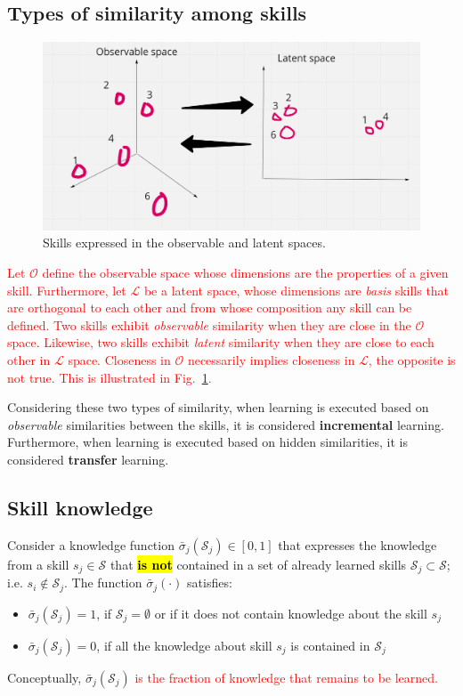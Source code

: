 \subsection{Types of similarity among skills}
\begin{figure}[!ht]
	\centering
	\includegraphics[width=0.95\columnwidth]{fig/observable_to_latent.png}
	\caption{Skills expressed in the observable and latent spaces.}
	\label{fig:types_of_similarity}
\end{figure}
\textcolor{red}{Let $\mathcal{O}$ define the observable space whose dimensions are the properties of a given skill. Furthermore, let $\mathcal{L}$ be a latent space, whose dimensions are \emph{basis} skills that are orthogonal to each other and from whose composition any skill can be defined. Two skills exhibit \emph{observable} similarity when they are close in the $\mathcal{O}$ space. Likewise, two skills exhibit \emph{latent} similarity when they are close to each other in $\mathcal{L}$ space. Closeness in $\mathcal{O}$ necessarily implies closeness in $\mathcal{L}$, the opposite is not true. This is illustrated in Fig.~\ref{fig:types_of_similarity}.}

Considering these two types of similarity, when learning is executed based on \emph{observable} similarities between the skills, it is considered \textbf{incremental} learning. Furthermore, when learning is executed based on hidden similarities, it is considered \textbf{transfer} learning.

\subsection{Skill knowledge}
Consider a knowledge function $\bar{\sigma}_j(\mathcal{S}_j)\in [0,1]$ that expresses the knowledge from a skill  $s_j \in \mathcal{S}$ that \hl{\textbf{is not}} contained in a set of already learned skills $\mathcal{S}_j \subset \mathcal{S}$; i.e. $s_i \notin \mathcal{S}_j$. The function $\bar{\sigma}_j(\cdot)$ satisfies:
\begin{itemize}
	\item $\bar{\sigma}_j(\mathcal{S}_j) = 1$, if $\mathcal{S}_j=\emptyset$ or if it does not contain knowledge about the skill $s_j$
	\item $\bar{\sigma}_j(\mathcal{S}_j) = 0$, if all the knowledge about skill $s_j$ is contained in $\mathcal{S}_j$
\end{itemize} 
Conceptually, $\bar{\sigma}_j(\mathcal{S}_j)$ \textcolor{red}{is the fraction of knowledge that remains to be learned.}

